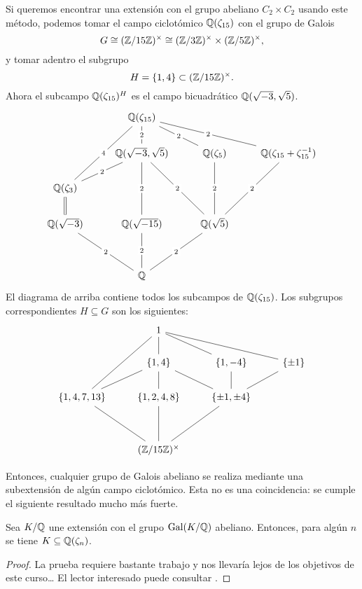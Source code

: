 \begin{ejemplo}
  Si queremos encontrar una extensión con el grupo abeliano $C_2\times C_2$
  usando este método, podemos tomar el campo ciclotómico $\mathbb{Q} (\zeta_{15})$
  con el grupo de Galois
  $$G \cong (\mathbb{Z}/15\mathbb{Z})^\times \cong (\mathbb{Z}/3\mathbb{Z})^\times \times (\mathbb{Z}/5\mathbb{Z})^\times,$$
  y tomar adentro el subgrupo
  $$H = \{ 1, 4 \} \subset (\mathbb{Z}/15\mathbb{Z})^\times.$$
  Ahora el subcampo $\mathbb{Q} (\zeta_{15})^H$ es el campo bicuadrático
  $\mathbb{Q} (\sqrt{-3}, \sqrt{5})$.
  \[ \begin{tikzcd}
    & \QQ (\zeta_{15})\ar[-]{d}[description]{2}\ar[-]{ddl}[description]{4}\ar[-]{dr}[description]{2}\ar[-]{drr}[description]{2} \\
    & \QQ (\sqrt{-3},\sqrt{5})\ar[-]{dd}[description]{2}\ar[-]{dl}[description]{2}\ar[-]{ddr}[description]{2} & \QQ (\zeta_5) \ar[-]{dd}[description]{2} & \QQ (\zeta_{15} + \zeta_{15}^{-1}) \ar[-]{ddl}[description]{2} \\
    \QQ (\zeta_3) \ar[equals]{d} \\
    \QQ (\sqrt{-3})\ar[-]{ddr}[description]{2} & \QQ (\sqrt{-15})\ar[-]{dd}[description]{2} & \QQ (\sqrt{5})\ar[-]{ddl}[description]{2} \\
    \\
    & \QQ
  \end{tikzcd} \]
  El diagrama de arriba contiene todos los subcampos de $\mathbb{Q} (\zeta_{15})$. Los
  subgrupos correspondientes $H \subseteq G$ son los siguientes:
  \[ \begin{tikzcd}
    & 1\ar[-]{d}\ar[-]{dr}\ar[-]{ddl}\ar[-]{drr} \\
    & \{ 1, 4 \} \ar[-]{d}\ar[-]{dl}\ar[-]{dr} & \{ 1, -4 \} \ar[-]{d} & \{ \pm 1 \}\ar[-]{dl} \\
    \{ 1, 4, 7, 13 \}\ar[-]{ddr} & \{ 1, 2, 4, 8 \}\ar[-]{dd} & \{ \pm 1, \pm 4 \}\ar[-]{ddl} \\
    \\
    & (\ZZ/15\ZZ)^\times
  \end{tikzcd} \]
\end{ejemplo}

Entonces, cualquier grupo de Galois abeliano se realiza mediante una
subextensión de algún campo ciclotómico. Esta no es una coincidencia:
se cumple el siguiente resultado mucho más fuerte.

\begin{teorema}
  Sea $K/\mathbb{Q}$ une extensión con el grupo $\operatorname{Gal} (K/\mathbb{Q})$ abeliano. Entonces, para
  algún $n$ se tiene $K \subseteq \mathbb{Q} (\zeta_n)$.

  \begin{proof}
    La prueba requiere bastante trabajo y nos llevaría lejos de los objetivos
    de este curso\dots{} El lector interesado puede consultar
    \cite[Chapter~14]{Washington-GTM83}.
  \end{proof}
\end{teorema}

